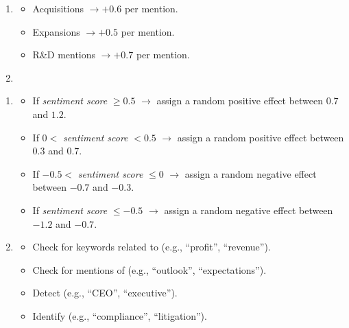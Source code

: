\documentclass[3p,times,procedia]{elsarticle}
\begin{document}
\begin{enumerate}
    \item {}
    \begin{itemize}
        \item Acquisitions $\rightarrow +0.6$ per mention.
        \item Expansions $\rightarrow +0.5$ per mention.
        \item R\&D mentions $\rightarrow +0.7$ per mention.
    \end{itemize}

    \item {}

\end{enumerate}
\begin{enumerate}
    \item {}
    \begin{itemize}
    \item If \textit{sentiment score} $\geq 0.5$ $\rightarrow$ assign a random positive effect between $0.7$ and $1.2$.
    \item If $0 <$ \textit{sentiment score} $< 0.5$ $\rightarrow$ assign a random positive effect between $0.3$ and $0.7$.
    \item If $-0.5 <$ \textit{sentiment score} $\leq 0$ $\rightarrow$ assign a random negative effect between $-0.7$ and $-0.3$.
    \item If \textit{sentiment score} $\leq -0.5$ $\rightarrow$ assign a random negative effect between $-1.2$ and $-0.7$.
\end{itemize}


    \item {}
    \begin{itemize}
        \item Check for keywords related to  (e.g., ``profit'', ``revenue'').
        \item Check for mentions of  (e.g., ``outlook'', ``expectations'').
        \item Detect  (e.g., ``CEO'', ``executive'').
        \item Identify  (e.g., ``compliance'', ``litigation'').
    \end{itemize}


\end{enumerate}
\end{document}
